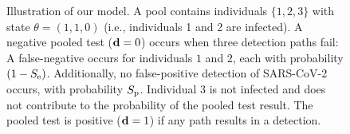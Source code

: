 \documentclass{article}
\begin{document}

\begin{figure}[H]
  \centering
  \caption{Illustration of our model. A pool contains individuals
    $\{1,2,3\}$ with state $\theta=(1,1,0)$ (i.e., individuals 1 and 2
    are infected). A negative pooled test ($\mathbf{d}=0$) occurs when
    three detection paths fail: A false-negative occurs for
    individuals $1$ and $2$, each with probability $(1-S_{\text{e}})$.
    Additionally, no false-positive detection of SARS-CoV-2 occurs,
    with probability $S_{\text{p}}$. Individual $3$ is not infected and does
    not contribute to the probability of the pooled test result. The
    pooled test is positive ($\mathbf{d}=1$) if any path results in a
    detection.}\label{fig:likelihood}
\end{figure}
\end{document}
